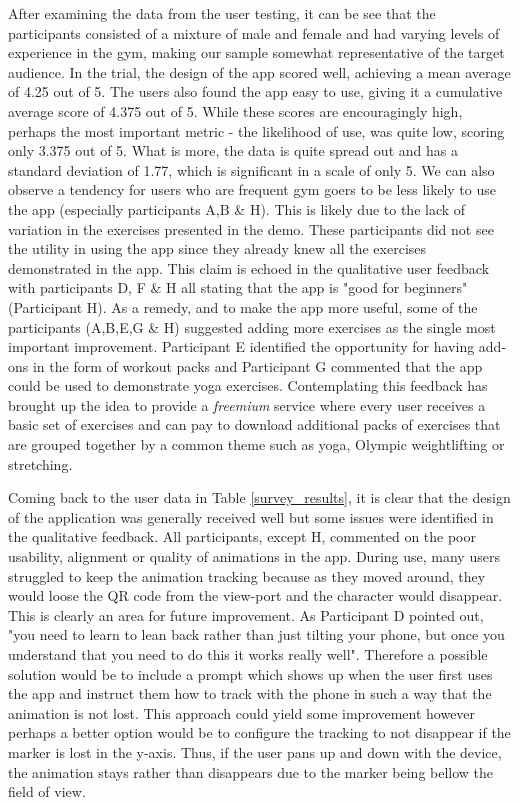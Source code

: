 \documentclass{l4proj}
\begin{document}
After examining the data from the user testing, it can be see that the participants consisted of a mixture of male and female and had varying levels of experience in the gym, making our sample somewhat representative of the target audience. In the trial, the design of the app scored well, achieving a mean average of 4.25 out of 5. The users also found the app easy to use, giving it a cumulative average score of 4.375 out of 5. While these scores are encouragingly high, perhaps the most important metric - the likelihood of use, was quite low, scoring only 3.375 out of 5. What is more, the data is quite spread out and has a standard deviation of 1.77, which is significant in a scale of only 5. We can also observe a tendency for users who are frequent gym goers to be less likely to use the app (especially participants A,B \& H). This is likely due to the lack of variation in the exercises presented in the demo. These participants did not see the utility in using the app since they already knew all the exercises demonstrated in the app. This claim is echoed in the qualitative user feedback with participants D, F \& H all stating that the app is "good for beginners" (Participant H). As a remedy, and to make the app more useful, some of the participants (A,B,E,G \& H) suggested adding more exercises as the single most important improvement. Participant E identified the opportunity for having add-ons in the form of workout packs and Participant G commented that the app could be used to demonstrate yoga exercises. Contemplating this feedback has brought up the idea to provide a \textit{freemium} service where every user receives a basic set of exercises and can pay to download additional packs of exercises that are grouped together by a common theme such as yoga, Olympic weightlifting or stretching. 

Coming back to the user data in Table \ref{survey_results}, it is clear that the design of the application was generally received well but some issues were identified in the qualitative feedback. All participants, except H, commented on the poor usability, alignment or quality of animations in the app. During use, many users struggled to keep the animation tracking because as they moved around, they would loose the QR code from the view-port and the character would disappear. This is clearly an area for future improvement. As Participant D pointed out, "you need to learn to lean back rather than just tilting your phone, but once you understand that you need to do this it works really well". Therefore a possible solution would be to include a prompt which shows up when the user first uses the app and instruct them how to track with the phone in such a way that the animation is not lost. This approach could yield some improvement however perhaps a better option would be to configure the tracking to not disappear if the marker is lost in the y-axis. Thus, if the user pans up and down with the device, the animation stays rather than disappears due to the marker being bellow the field of view. 
\end{document}
